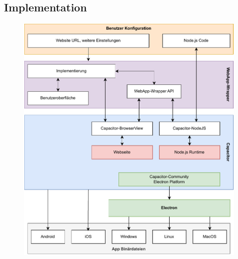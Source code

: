 \subsection{Implementation}

\begin{figure}[H]
    \centering
    \includegraphics[width=\textwidth]{assets/04_WebApp-Wrapper/03_Aufbau.drawio.pdf}
\end{figure}


\clearpage
